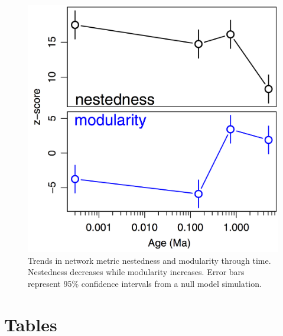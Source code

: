 \begin{figure}[!hp] 
  \centering
  \includegraphics[scale=0.4]{figs/fig_netMets.pdf}
  \caption[Patterns in degree distributions across sites]{Trends in
    network metric nestedness and modularity through time. Nestedness
    decreases while modularity increases. Error bars represent 95\%
    confidence intervals from a null model simulation.}
\label{fig:netMet}
\end{figure}

\clearpage

\section*{Tables}

